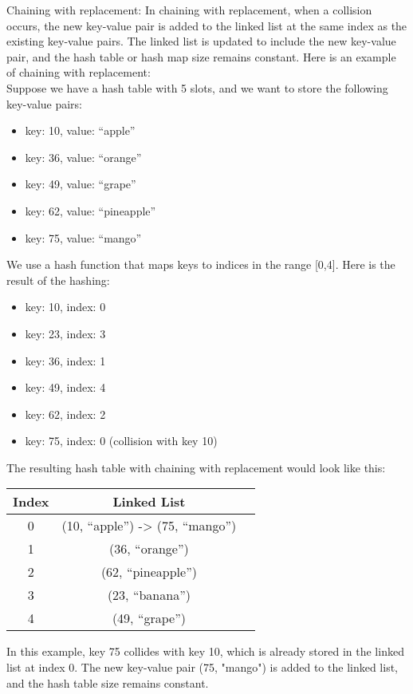 \documentclass{article}
\begin{document}
Chaining with replacement: In chaining with replacement, when a collision occurs, the new key-value pair is added to the linked list at the same index as the existing key-value pairs. The linked list is updated to include the new key-value pair, and the hash table or hash map size remains constant. Here is an example of chaining with replacement:\\

Suppose we have a hash table with 5 slots, and we want to store the following key-value pairs:
\begin{itemize}
	\item key: 10, value: ``apple''
	\item key: 36, value: ``orange''
	\item key: 49, value: ``grape''
	\item key: 62, value: ``pineapple''
	\item key: 75, value: ``mango''
\end{itemize}
We use a hash function that maps keys to indices in the range [0,4]. Here is the result of the hashing:
\begin{itemize}
	\item key: 10, index: 0
	\item key: 23, index: 3
	\item key: 36, index: 1
	\item key: 49, index: 4
	\item key: 62, index: 2
	\item key: 75, index: 0 (collision with key 10)
\end{itemize}
The resulting hash table with chaining with replacement would look like this:
\pagebreak
\begin{table}[h]
	\centering
	\begin{tabular}{|c|c|c|}
	\hline
	\textbf{Index} & \textbf{Linked List} \\
	\hline
	0 & (10, ``apple'') -> (75, ``mango'') \\
	\hline
	1 & (36, ``orange'') \\
	\hline
	2	& (62, ``pineapple'') \\
	\hline
	3	& (23, ``banana'') \\
	\hline
	4	& (49, ``grape'') \\
	\hline
\end{tabular}
\end{table}

In this example, key 75 collides with key 10, which is already stored in the linked list at index 0. The new key-value pair (75, "mango") is added to the linked list, and the hash table size remains constant.\\
\end{document}
